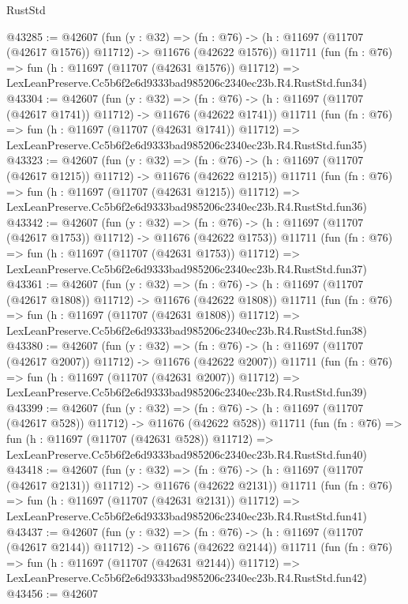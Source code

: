 \begin{lexlean}{RustStd}
\begin{coremodule}
@43285 := @42607
    (fun (y : @32) =>
    (fn : @76) -> (h : @11697 (@11707 (@42617 @1576)) @11712) -> @11676 (@42622 @1576))
    @11711
    (fun (fn : @76) =>
    fun (h : @11697 (@11707 (@42631 @1576)) @11712) =>
    LexLeanPreserve.Cc5b6f2e6d9333bad985206c2340ec23b.R4.RustStd.fun34)
@43304 := @42607
    (fun (y : @32) =>
    (fn : @76) -> (h : @11697 (@11707 (@42617 @1741)) @11712) -> @11676 (@42622 @1741))
    @11711
    (fun (fn : @76) =>
    fun (h : @11697 (@11707 (@42631 @1741)) @11712) =>
    LexLeanPreserve.Cc5b6f2e6d9333bad985206c2340ec23b.R4.RustStd.fun35)
@43323 := @42607
    (fun (y : @32) =>
    (fn : @76) -> (h : @11697 (@11707 (@42617 @1215)) @11712) -> @11676 (@42622 @1215))
    @11711
    (fun (fn : @76) =>
    fun (h : @11697 (@11707 (@42631 @1215)) @11712) =>
    LexLeanPreserve.Cc5b6f2e6d9333bad985206c2340ec23b.R4.RustStd.fun36)
@43342 := @42607
    (fun (y : @32) =>
    (fn : @76) -> (h : @11697 (@11707 (@42617 @1753)) @11712) -> @11676 (@42622 @1753))
    @11711
    (fun (fn : @76) =>
    fun (h : @11697 (@11707 (@42631 @1753)) @11712) =>
    LexLeanPreserve.Cc5b6f2e6d9333bad985206c2340ec23b.R4.RustStd.fun37)
@43361 := @42607
    (fun (y : @32) =>
    (fn : @76) -> (h : @11697 (@11707 (@42617 @1808)) @11712) -> @11676 (@42622 @1808))
    @11711
    (fun (fn : @76) =>
    fun (h : @11697 (@11707 (@42631 @1808)) @11712) =>
    LexLeanPreserve.Cc5b6f2e6d9333bad985206c2340ec23b.R4.RustStd.fun38)
@43380 := @42607
    (fun (y : @32) =>
    (fn : @76) -> (h : @11697 (@11707 (@42617 @2007)) @11712) -> @11676 (@42622 @2007))
    @11711
    (fun (fn : @76) =>
    fun (h : @11697 (@11707 (@42631 @2007)) @11712) =>
    LexLeanPreserve.Cc5b6f2e6d9333bad985206c2340ec23b.R4.RustStd.fun39)
@43399 := @42607
    (fun (y : @32) =>
    (fn : @76) -> (h : @11697 (@11707 (@42617 @528)) @11712) -> @11676 (@42622 @528))
    @11711
    (fun (fn : @76) =>
    fun (h : @11697 (@11707 (@42631 @528)) @11712) =>
    LexLeanPreserve.Cc5b6f2e6d9333bad985206c2340ec23b.R4.RustStd.fun40)
@43418 := @42607
    (fun (y : @32) =>
    (fn : @76) -> (h : @11697 (@11707 (@42617 @2131)) @11712) -> @11676 (@42622 @2131))
    @11711
    (fun (fn : @76) =>
    fun (h : @11697 (@11707 (@42631 @2131)) @11712) =>
    LexLeanPreserve.Cc5b6f2e6d9333bad985206c2340ec23b.R4.RustStd.fun41)
@43437 := @42607
    (fun (y : @32) =>
    (fn : @76) -> (h : @11697 (@11707 (@42617 @2144)) @11712) -> @11676 (@42622 @2144))
    @11711
    (fun (fn : @76) =>
    fun (h : @11697 (@11707 (@42631 @2144)) @11712) =>
    LexLeanPreserve.Cc5b6f2e6d9333bad985206c2340ec23b.R4.RustStd.fun42)
@43456 := @42607

\end{coremodule}
\end{lexlean}
